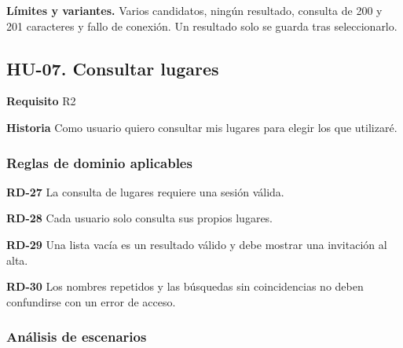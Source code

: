 {\fontsize{9}{11.8}\selectfont\textbf{Límites y variantes.} Varios candidatos, ningún resultado, consulta de 200 y 201 caracteres y fallo de conexión. Un resultado solo se guarda tras seleccionarlo.\par}\vspace{4pt}
\clearpage\subsection*{HU-07. Consultar lugares}

\textbf{Requisito} R2\par

\textbf{Historia} Como usuario quiero consultar mis lugares para elegir los que utilizaré.\par

\subsubsection*{Reglas de dominio aplicables}

\textbf{RD-27} La consulta de lugares requiere una sesión válida.\par

\textbf{RD-28} Cada usuario solo consulta sus propios lugares.\par

\textbf{RD-29} Una lista vacía es un resultado válido y debe mostrar una invitación al alta.\par

\textbf{RD-30} Los nombres repetidos y las búsquedas sin coincidencias no deben confundirse con un error de acceso.\par

\subsubsection*{Análisis de escenarios}


